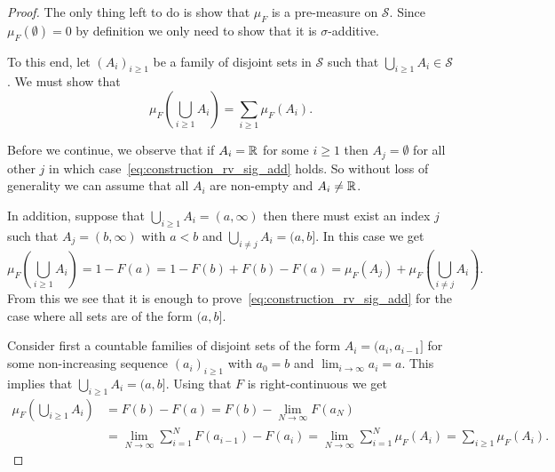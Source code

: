 \begin{proof}
The only thing left to do is show that $\mu_F$ is a pre-measure on $\mathcal{S}$. Since $\mu_F(\emptyset) = 0$ by definition we only need to show that it is $\sigma$-additive. 

To this end, let $(A_i)_{i \ge 1}$ be a family of disjoint sets in $\mathcal{S}$ such that $\bigcup_{i \ge 1} A_i \in \mathcal{S}$. We must show that
\begin{equation}\label{eq:construction_rv_sig_add}
	\mu_F(\bigcup_{i \ge 1} A_i) = \sum_{i \ge 1} \mu_F(A_i).
\end{equation}

Before we continue, we observe that if $A_i = \mathbb R$ for some $i \ge 1$ then $A_j = \emptyset$ for all other $j$ in which case~\eqref{eq:construction_rv_sig_add} holds. So without loss of generality we can assume that all $A_i$ are non-empty and $A_i \ne \mathbb R$.

In addition, suppose that $\bigcup_{i \ge 1} A_i = (a, \infty)$ then there must exist an index $j$ such that $A_j = (b,\infty)$ with $a < b$ and $\bigcup_{i \ne j} A_i = (a, b]$. In this case we get
\[
	\mu_F(\bigcup_{i \ge 1} A_i) = 1 - F(a) = 1 - F(b) + F(b) - F(a) = \mu_F(A_j) + \mu_F(\bigcup_{i \ne j} A_i).
\]
From this we see that it is enough to prove~\eqref{eq:construction_rv_sig_add} for the case where all sets are of the form $(a,b]$.

%


Consider first a countable families of disjoint sets of the form $A_i = (a_i, a_{i-1}]$ for some non-increasing sequence $(a_i)_{i \ge 1}$ with $a_0 = b$ and $\lim_{i \to \infty} a_i = a$. This implies that $\bigcup_{i \ge 1} A_i = (a, b]$. Using that $F$ is right-continuous we get
\begin{align*}
	\mu_F(\bigcup_{i \ge 1} A_i) &= F(b) - F(a) = F(b) - \lim_{N \to \infty} F(a_N) \\
	&= \lim_{N \to \infty} \sum_{i = 1}^N F(a_{i-1}) - F(a_i) = \lim_{N \to \infty} \sum_{i = 1}^N \mu_F(A_i) 
	= \sum_{i \ge 1} \mu_F(A_i).
\end{align*}


\end{proof}
